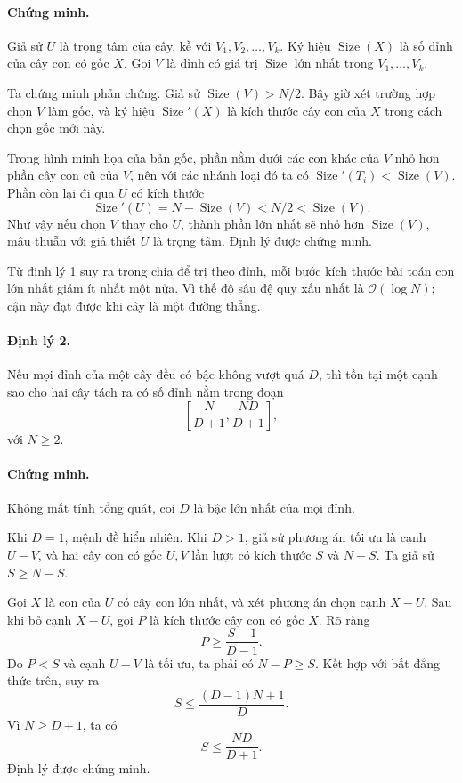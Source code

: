\documentclass[11pt]{article}
\newcommand{\Oh}{\mathcal{O}}
\newcommand{\Size}{\operatorname{Size}}
\begin{document}
\paragraph{Chứng minh.}
Giả sử \(U\) là trọng tâm của cây, kề với
\(V_1,V_2,\ldots,V_k\). Ký hiệu \(\Size(X)\) là số đỉnh của cây con có gốc
\(X\). Gọi \(V\) là đỉnh có giá trị \(\Size\) lớn nhất trong
\(V_1,\ldots,V_k\).

Ta chứng minh phản chứng. Giả sử \(\Size(V)>N/2\). Bây giờ xét trường hợp
chọn \(V\) làm gốc, và ký hiệu \(\Size'(X)\) là kích thước cây con của \(X\)
trong cách chọn gốc mới này.

Trong hình minh họa của bản gốc, phần nằm dưới các con khác của \(V\) nhỏ hơn
phần cây con cũ của \(V\), nên với các nhánh loại đó ta có
\(\Size'(T_i)<\Size(V)\). Phần còn lại đi qua \(U\) có kích thước
\[
  \Size'(U)=N-\Size(V)<N/2<\Size(V).
\]
Như vậy nếu chọn \(V\) thay cho \(U\), thành phần lớn nhất sẽ nhỏ hơn
\(\Size(V)\), mâu thuẫn với giả thiết \(U\) là trọng tâm. Định lý được chứng
minh.

Từ định lý 1 suy ra trong chia để trị theo đỉnh, mỗi bước kích thước bài toán
con lớn nhất giảm ít nhất một nửa. Vì thế độ sâu đệ quy xấu nhất là
\(\Oh(\log N)\); cận này đạt được khi cây là một đường thẳng.

\paragraph{Định lý 2.}
Nếu mọi đỉnh của một cây đều có bậc không vượt quá \(D\), thì tồn tại một cạnh
sao cho hai cây tách ra có số đỉnh nằm trong đoạn
\[
  \left[\frac{N}{D+1},\frac{ND}{D+1}\right],
\]
với \(N\ge 2\).

\paragraph{Chứng minh.}
Không mất tính tổng quát, coi \(D\) là bậc lớn nhất của mọi đỉnh.

Khi \(D=1\), mệnh đề hiển nhiên. Khi \(D>1\), giả sử phương án tối ưu là cạnh
\(U-V\), và hai cây con có gốc \(U,V\) lần lượt có kích thước \(S\) và
\(N-S\). Ta giả sử \(S\ge N-S\).

Gọi \(X\) là con của \(U\) có cây con lớn nhất, và xét phương án chọn cạnh
\(X-U\). Sau khi bỏ cạnh \(X-U\), gọi \(P\) là kích thước cây con có gốc
\(X\). Rõ ràng
\[
  P\ge \frac{S-1}{D-1}.
\]
Do \(P<S\) và cạnh \(U-V\) là tối ưu, ta phải có \(N-P\ge S\). Kết hợp với
bất đẳng thức trên, suy ra
\[
  S\le \frac{(D-1)N+1}{D}.
\]
Vì \(N\ge D+1\), ta có
\[
  S\le \frac{ND}{D+1}.
\]
Định lý được chứng minh.
\end{document}
